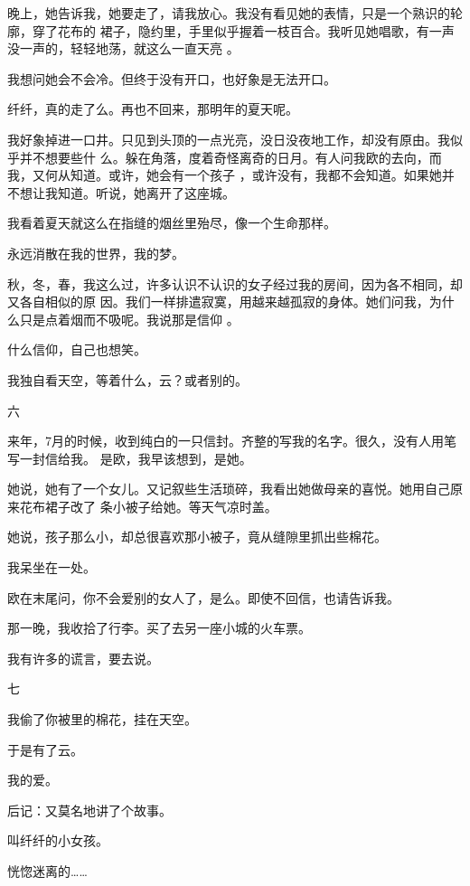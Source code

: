 \documentclass[12pt,a4paper]{article}
\newcommand{\subpart}[1]{
	\begingroup \par
	\vspace{1ex} \centering #1
	\par \endgroup \nopagebreak[4]
}
\begin{document}
		晚上，她告诉我，她要走了，请我放心。我没有看见她的表情，只是一个熟识的轮廓，穿了花布的
	裙子，隐约里，手里似乎握着一枝百合。我听见她唱歌，有一声没一声的，轻轻地荡，就这么一直天亮
	。

		我想问她会不会冷。但终于没有开口，也好象是无法开口。\par
		纤纤，真的走了么。再也不回来，那明年的夏天呢。

		我好象掉进一口井。只见到头顶的一点光亮，没日没夜地工作，却没有原由。我似乎并不想要些什
	么。躲在角落，度着奇怪离奇的日月。有人问我欧的去向，而我，又何从知道。或许，她会有一个孩子
	，或许没有，我都不会知道。如果她并不想让我知道。听说，她离开了这座城。

		我看着夏天就这么在指缝的烟丝里殆尽，像一个生命那样。\par
		永远消散在我的世界，我的梦。

		秋，冬，春，我这么过，许多认识不认识的女子经过我的房间，因为各不相同，却又各自相似的原
	因。我们一样排遣寂寞，用越来越孤寂的身体。她们问我，为什么只是点着烟而不吸呢。我说那是信仰
	。

		什么信仰，自己也想笑。\par
		我独自看天空，等着什么，云？或者别的。

		\subpart{六}

		来年，7月的时候，收到纯白的一只信封。齐整的写我的名字。很久，没有人用笔写一封信给我。
	是欧，我早该想到，是她。

		她说，她有了一个女儿。又记叙些生活琐碎，我看出她做母亲的喜悦。她用自己原来花布裙子改了
	条小被子给她。等天气凉时盖。

		她说，孩子那么小，却总很喜欢那小被子，竟从缝隙里抓出些棉花。\par
		我呆坐在一处。\par
		欧在末尾问，你不会爱别的女人了，是么。即使不回信，也请告诉我。\par
		那一晚，我收拾了行李。买了去另一座小城的火车票。\par
		我有许多的谎言，要去说。

		\subpart{七}

		我偷了你被里的棉花，挂在天空。\par
		于是有了云。\par
		我的爱。\par
		后记：又莫名地讲了个故事。\par
		叫纤纤的小女孩。\par
		恍惚迷离的……

	\endwriting


\end{document}
